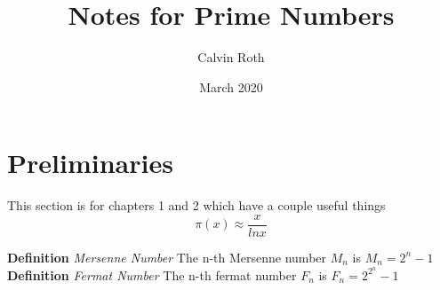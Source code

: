 \documentclass{article}
\title{Notes for Prime Numbers}
\author{Calvin Roth}
\date{March 2020}
\begin{document}
\newtheorem{theorem}{Theorem}
\newtheorem{lem}{Lemma}[section]
\newtheorem{claim}[lem]{Claim}

\newcommand{\prob}[1]{\section{} \noindent \textbf{Statement} #1 $ $\\ \textbf{Solution} $ $\\ }
\newcommand{\soln}{\noindent \textbf{Solution} $ $\\ }
\newcommand{\sol}{\noindent \textbf{Solution} $ $}

\newcommand{\IC}[1]{\noindent \textbf{Inductive Case} #1 $ $ \\}
\newcommand{\BC}[1]{\noindent \textbf{Base Case} #1 $ $ \\}

\newcommand{\inner}[1]{\langle #1 | #1\rangle}

\newcommand{\R}{\mathbb{R}}
\newcommand{\Z}{\mathbb{Z}}
\newcommand{\N}{\mathbb{N}}
\newcommand{\C}{\mathbb{C}}
\newcommand{\Q}{\mathbb{Q}}
\newcommand{\bR}{$\mathbb{R}$ }
\newcommand{\bN}{$\mathbb{N}$ }
\newcommand{\bZ}{$\mathbb{Z}$ }
\newcommand{\bC}{$\mathbb{C}$ }
\newcommand{\bQ}{$\mathbb{Q}$ }

\newcommand{\curve}[1]{C($\#1$)}

\newcommand{\set}[1]{\{$#1$\}}
\newcommand{\setc}[2]{\{$#1$ : $#2$\}}
\newcommand{\term}[2]{\textbf{Definition} \textit{#1} #2 $ $ \\}
\makeatletter
\renewcommand{\@seccntformat}[1]{Chapter \csname the#1\endcsname\quad}
\makeatother

\maketitle 

\section{Preliminaries}

This section is for chapters 1 and 2 which have a couple useful things
\begin{equation}
    \tag{Prime Number Theorem}
    \pi ( x ) \approx \frac{x }{ln x}
\end{equation}

\term{Mersenne Number}{The n-th Mersenne number $M_n$ is $M_n = 2^n - 1$}
\term{Fermat Number}{The n-th fermat number $F_n$ is $F_n = 2^{2^n} - 1$}
\end{document}
